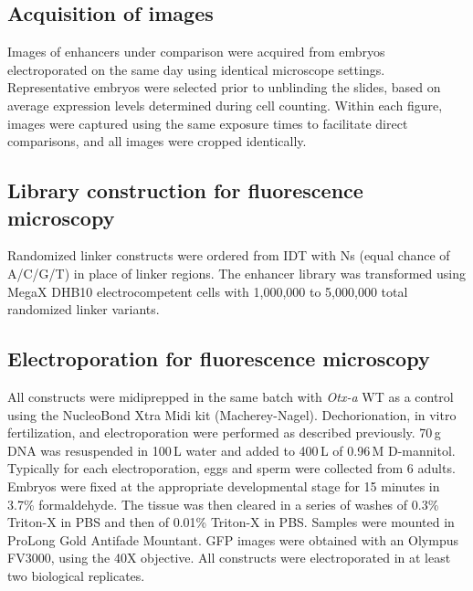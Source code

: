 \subsection{Acquisition of images}
Images of enhancers under comparison were acquired from embryos electroporated on the same day using identical microscope settings. Representative embryos were selected prior to unblinding the slides, based on average expression levels determined during cell counting. Within each figure, images were captured using the same exposure times to facilitate direct comparisons, and all images were cropped identically.

\subsection{Library construction for fluorescence microscopy}
Randomized linker constructs were ordered from IDT with Ns (equal chance of A/C/G/T) in place of linker regions. The enhancer library was transformed using MegaX DHB10 electrocompetent cells with 1,000,000 to 5,000,000 total randomized linker variants.

\subsection{Electroporation for fluorescence microscopy}
All constructs were midiprepped in the same batch with \textit{Otx-a} WT as a control using the NucleoBond Xtra Midi kit (Macherey-Nagel). Dechorionation, in vitro fertilization, and electroporation were performed as described previously\cite{Farley2016-eh}. 70\,\textmu g DNA was resuspended in 100\,\textmu L water and added to 400\,\textmu L of 0.96\,M D-mannitol. Typically for each electroporation, eggs and sperm were collected from 6 adults. Embryos were fixed at the appropriate developmental stage for 15 minutes in 3.7\% formaldehyde. The tissue was then cleared in a series of washes of 0.3\% Triton-X in PBS and then of 0.01\% Triton-X in PBS. Samples were mounted in ProLong Gold Antifade Mountant. GFP images were obtained with an Olympus FV3000, using the 40X objective. All constructs were electroporated in at least two biological replicates.

